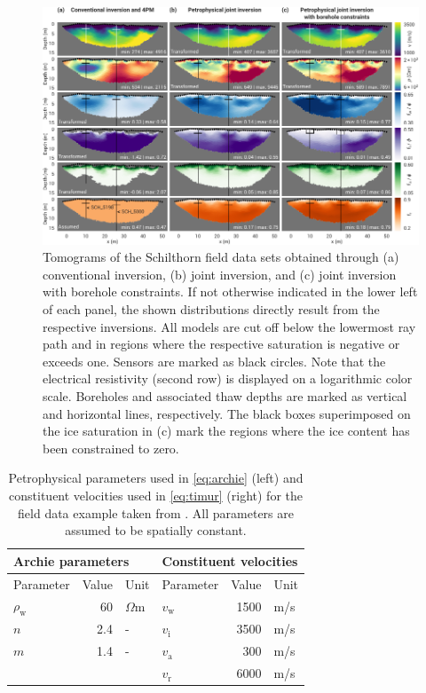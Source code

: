 \documentclass[extra]{gji}
\begin{document}
\begin{figure}
 \centering
 \includegraphics[width=\textwidth]{./Fig5_two_columns}
 \caption{Tomograms of the Schilthorn field data sets obtained through (a) conventional inversion, (b) joint inversion, and (c) joint inversion with borehole constraints. If not otherwise indicated in the lower left of each panel, the shown distributions directly result from the respective inversions.
 All models are cut off below the lowermost ray path and in regions where the respective saturation is negative or exceeds one. Sensors are marked as black circles. Note that the electrical resistivity (second row) is displayed on a logarithmic color scale. Boreholes and associated thaw depths are marked as vertical and horizontal lines, respectively. The black boxes superimposed on the ice saturation in (c) mark the regions where the ice content has been constrained to zero.}
 \label{fig:schinv}
\end{figure}

\begin{table}
 \centering
 \caption{Petrophysical parameters used in \autoref{eq:archie} (left) and constituent velocities used in \autoref{eq:timur} (right) for the field data example taken from \cite{Pellet2016}. All parameters are assumed to be spatially constant.}
 \begin{tabular}{lrllrl}
  \toprule
  \multicolumn{3}{l}{\textbf{Archie parameters}} & \multicolumn{3}{l}{\textbf{Constituent velocities}} \\ \midrule
  Parameter       & Value & Unit      & Parameter    & Value & Unit \\ \midrule
  $\rho_\text{w}$ & 60    & $\Omega$m & $v_\text{w}$ & 1500  & m/s  \\
  $n$             & 2.4   & -         & $v_\text{i}$ & 3500  & m/s  \\
  $m$             & 1.4   & -         & $v_\text{a}$ & 300   & m/s  \\
                  &       &           & $v_\text{r}$ & 6000  & m/s  \\
  \bottomrule
 \end{tabular}
 \label{tab:parameters_field}
\end{table}
\end{document}
